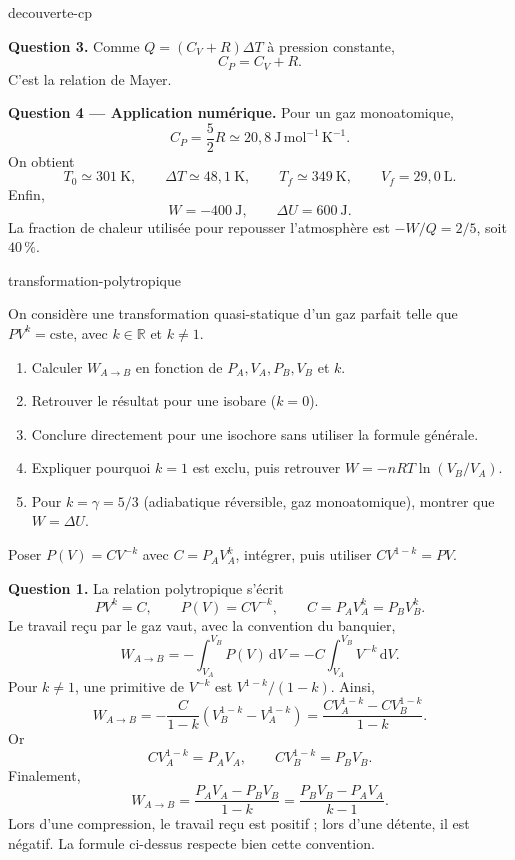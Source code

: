 \begin{exo}{decouverte-cp}
\begin{solution}
\textbf{Question 3.} Comme $Q=(C_V+R)\Delta T$ à pression constante,
\[
C_P=C_V+R.
\]
C'est la relation de Mayer.

\textbf{Question 4 --- Application numérique.} Pour un gaz monoatomique,
\[
C_P=\frac52R\simeq20{,}8\ \mathrm{J\,mol^{-1}\,K^{-1}}.
\]
On obtient
\[
T_0\simeq301\ \mathrm{K},\qquad
\Delta T\simeq48{,}1\ \mathrm{K},\qquad
T_f\simeq349\ \mathrm{K},\qquad
V_f=29{,}0\ \mathrm{L}.
\]
Enfin,
\[
W=-400\ \mathrm{J},\qquad
\Delta U=600\ \mathrm{J}.
\]
La fraction de chaleur utilisée pour repousser l'atmosphère est
$-W/Q=2/5$, soit $40\,\%$.
\end{solution}
\end{exo}

\begin{exo}[Travail d'une transformation polytropique $PV^k=\text{cste}$]{transformation-polytropique}

On considère une transformation quasi-statique d'un gaz parfait telle que
$PV^k=\text{cste}$, avec $k\in\mathbb{R}$ et $k\neq1$.

\begin{enumerate}
\item Calculer $W_{A\to B}$ en fonction de $P_A,V_A,P_B,V_B$ et $k$.
\item Retrouver le résultat pour une isobare ($k=0$).
\item Conclure directement pour une isochore sans utiliser la formule générale.
\item Expliquer pourquoi $k=1$ est exclu, puis retrouver $W=-nRT\ln(V_B/V_A)$.
\item Pour $k=\gamma=5/3$ (adiabatique réversible, gaz monoatomique), montrer que $W=\Delta U$.
\end{enumerate}

\begin{indication}
Poser $P(V)=CV^{-k}$ avec $C=P_AV_A^k$, intégrer, puis utiliser
$CV^{1-k}=PV$.
\end{indication}

\begin{solution}
\textbf{Question 1.} La relation polytropique s'écrit
\[
PV^k=C,
\qquad
P(V)=CV^{-k},
\qquad
C=P_AV_A^k=P_BV_B^k.
\]
Le travail reçu par le gaz vaut, avec la convention du banquier,
\[
W_{A\to B}
=-\int_{V_A}^{V_B}P(V)\,\mathrm{d}V
=-C\int_{V_A}^{V_B}V^{-k}\,\mathrm{d}V.
\]
Pour $k\neq1$, une primitive de $V^{-k}$ est
$V^{1-k}/(1-k)$. Ainsi,
\[
W_{A\to B}
=-\frac{C}{1-k}
\left(V_B^{1-k}-V_A^{1-k}\right)
=\frac{CV_A^{1-k}-CV_B^{1-k}}{1-k}.
\]
Or
\[
CV_A^{1-k}=P_AV_A,
\qquad
CV_B^{1-k}=P_BV_B.
\]
Finalement,
\[
\boxed{
W_{A\to B}
=\frac{P_AV_A-P_BV_B}{1-k}
=\frac{P_BV_B-P_AV_A}{k-1}
}.
\]
Lors d'une compression, le travail reçu est positif ; lors d'une détente, il
est négatif. La formule ci-dessus respecte bien cette convention.


\end{solution}
\end{exo}
